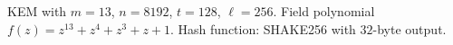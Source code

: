KEM with $m=13$, $n=8192$, $t=128$, $\ell=256$.
Field polynomial $f(z)=z^{13}+z^4+z^3+z+1$.
Hash function: SHAKE256 with $32$-byte output.
